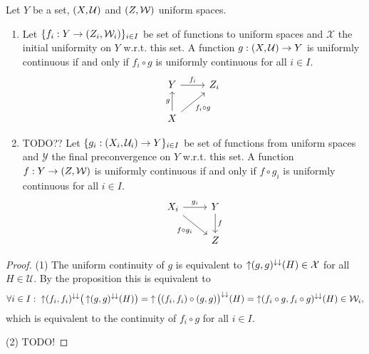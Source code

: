 \begin{corollary} \label{characteristicPropertyInitialFinalUniformity}
Let $Y$ be a set, $\left( X,\mathcal{U} \right)$ and $\left( Z, \mathcal{W} \right)$ uniform spaces.
\begin{enumerate}
\item Let $\{f_i: Y\to \left( Z_i, \mathcal{W}_i \right)\}_{i\in I}$ be set of functions to uniform spaces and $\mathcal{X}$ the initial uniformity on $Y$ w.r.t. this set. A function $g: \left( X, \mathcal{U} \right)\to Y$ is uniformly continuous \textup{if and only if} $f_i \circ g$ is uniformly continuous for all $i\in I$.
\[ \begin{tikzcd}
Y \ar[r, "f_i"] & Z_i \\ X \ar[u, "g"] \ar[ur, swap, "f_i\circ g"]
\end{tikzcd} \]
\item TODO?? Let $\{g_i: \left( X_i, \mathcal{U}_i \right) \to Y\}_{i\in I}$ be set of functions from uniform spaces and $\mathcal{Y}$ the final preconvergence on $Y$ w.r.t. this set. A function $f: Y\to \left( Z,\mathcal{W} \right)$ is uniformly continuous \textup{if and only if} $f\circ g_i$ is uniformly continuous for all $i\in I$.
\[ \begin{tikzcd}
X_i \ar[r, "g_i"] \ar[dr, swap, "f\circ g_i"] & Y \ar[d, "f"] \\ & Z
\end{tikzcd} \]
\end{enumerate}
\end{corollary}
\begin{proof}
(1) The uniform continuity of $g$ is equivalent to $\operatorname{\uparrow}(g,g)^{\downarrow\downarrow}(H)\in \mathcal{X}$ for all $H\in \mathcal{U}$. By the proposition this is equivalent to
\[ \forall i \in I: \; \operatorname{\uparrow}(f_i, f_i)^{\downarrow\downarrow}\big(\operatorname{\uparrow}(g,g)^{\downarrow\downarrow}(H)\big) = \operatorname{\uparrow}\big((f_i, f_i)\circ (g,g)\big)^{\downarrow\downarrow}(H) = \operatorname{\uparrow}(f_i\circ g, f_i\circ g)^{\downarrow\downarrow}(H) \in \mathcal{W}_i,  \]
which is equivalent to the continuity of $f_i\circ g$ for all $i\in I$.

(2) TODO!
\end{proof}

